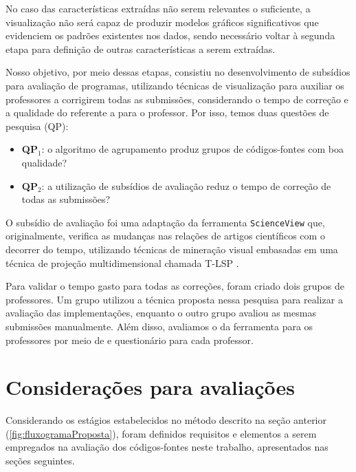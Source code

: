 	 	No caso das características extraídas não serem relevantes o suficiente, a
	 	visualização não será capaz de produzir modelos gráficos significativos que
	 	evidenciem os padrões existentes nos dados, sendo necessário voltar à segunda
	 	etapa para definição de outras características a serem extraídas.
	 	
	 	Nosso objetivo, por meio dessas etapas, consistiu no desenvolvimento de subsídios
	 	para avaliação de programas, utilizando técnicas de visualização para auxiliar os professores a
	 	corrigirem todas as submissões, considerando o tempo de correção e a qualidade do
	 	 referente a  para o professor.
	 	Por isso, temos duas questões de pesquisa (QP):
	 	
	 	\begin{itemize}
	 		\item \textbf{QP$_1$}: o algoritmo de agrupamento produz grupos de códigos-fontes
	 		com boa qualidade?
	 		\item \textbf{QP$_2$}: a utilização de subsídios de avaliação reduz o tempo
	 		de correção de todas as submissões?
	 	\end{itemize}
	 	
	 	O subsídio de avaliação foi uma adaptação da ferramenta \texttt{ScienceView}
	 	\cite{Alencar-etal:2012} que, originalmente, verifica as mudanças nas relações
	 	de artigos científicos com o decorrer do tempo, utilizando técnicas de mineração
	 	visual embasadas em uma técnica de projeção multidimensional chamada \acl{T-LSP}
	 	\cite{Alencar}.
	 	
	 	Para validar o tempo gasto para todas as correções, foram criado dois grupos de
	 	professores. Um grupo utilizou a técnica proposta nessa pesquisa para realizar
	 	a avaliação das implementações, enquanto o outro grupo avaliou as mesmas submissões
	 	manualmente. Além disso, avaliamos o  da ferramenta para os
	 	professores por meio de  e questionário para cada professor.
	 		
	\section{Considerações para avaliações}

		Considerando os estágios estabelecidos no método descrito na seção anterior
		(\ref{fig:fluxogramaProposta}), foram definidos requisitos e elementos a serem
		empregados na avaliação dos códigos-fontes neste trabalho, apresentados
		nas seções seguintes.

